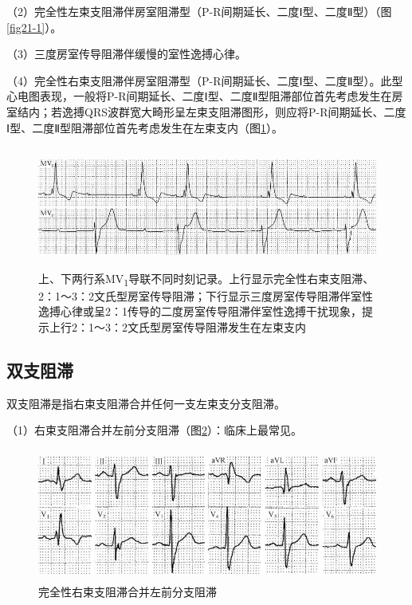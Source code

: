 （2）完全性左束支阻滞伴房室阻滞型（P-R间期延长、二度Ⅰ型、二度Ⅱ型）（图\ref{fig21-1}）。

（3）三度房室传导阻滞伴缓慢的室性逸搏心律。

（4）完全性右束支阻滞伴房室阻滞型（P-R间期延长、二度Ⅰ型、二度Ⅱ型）。此型心电图表现，一般将P-R间期延长、二度Ⅰ型、二度Ⅱ型阻滞部位首先考虑发生在房室结内；若逸搏QRS波群宽大畸形呈左束支阻滞图形，则应将P-R间期延长、二度Ⅰ型、二度Ⅱ型阻滞部位首先考虑发生在左束支内（图\ref{fig21-12}）。

\begin{figure}[!htbp]
 \centering
 \includegraphics[width=5.58333in,height=1.57292in]{./images/Image00360.jpg}
 \captionsetup{justification=centering}
 \caption{上、下两行系MV\textsubscript{1}导联不同时刻记录。上行显示完全性右束支阻滞、2：1～3：2文氏型房室传导阻滞；下行显示三度房室传导阻滞伴室性逸搏心律或呈2：1传导的二度房室传导阻滞伴室性逸搏干扰现象，提示上行2：1～3：2文氏型房室传导阻滞发生在左束支内}
 \label{fig21-12}
  \end{figure} 


\protect\hypertarget{text00028.htmlux5cux23subid351}{}{}

\subsection{双支阻滞}

双支阻滞是指右束支阻滞合并任何一支左束支分支阻滞。

（1）右束支阻滞合并左前分支阻滞（图\ref{fig21-13}）：临床上最常见。

\begin{figure}[!htbp]
 \centering
 \includegraphics[width=4.92708in,height=1.70833in]{./images/Image00361.jpg}
 \captionsetup{justification=centering}
 \caption{完全性右束支阻滞合并左前分支阻滞}
 \label{fig21-13}
  \end{figure} 

